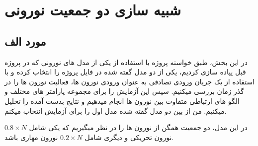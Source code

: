 
\section{شبیه سازی دو جمعیت نورونی}
    \subsection{مورد الف}
    در این بخش، طبق خواسته پروژه با استفاده از یکی از مدل های نورونی که در پروژه قبل پیاده سازی کردیم، یکی از دو مدل گفته شده در فایل پروژه را انتخاب کرده و با استفاده از یک جریان ورودی تصادفی به عنوان ورودی نورون ها، فعالیت نورون ها را در گذر زمان بررسی میکنیم. سپس این آزمایش را برای مجموعه پارامتر های مختلف و الگو های ارتباطی متفاوت بین نورون ها انجام میدهیم و نتایج بدست آمده را تحلیل میکنیم. من از بین دو مدل گفته شده مدل اول را برای آزمایش انتخاب میکنم.

    در این مدل، دو جمعیت همگن از نورون ها را در نظر میگیریم که یکی شامل 
    $0.8 \times N$ 
    نورون تحریکی و دیگری شامل
    $0.2 \times N$ 
    نورون مهاری باشد.

